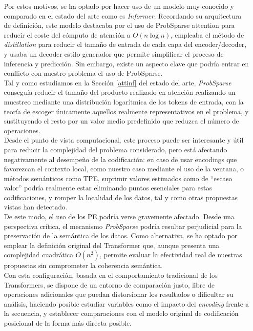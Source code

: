Por estos motivos, se ha optado por hacer uso de un modelo muy conocido y comparado en el estado del arte como es \textit{Informer}. Recordando su arquitectura de definición, este modelo destacaba por el uso de ProbSparse attention para reducir el coste del cómputo de atención a $O(n \log{n})$, empleaba el método de \textit{distillation} para reducir el tamaño de entrada de cada capa del encoder/decoder, y usaba un decoder estilo generador que permite simplificar el proceso de inferencia y predicción. Sin embargo, existe un aspecto clave que podría entrar en conflicto con nuestro problema el uso de ProbSparse.\\

Tal y como estudiamos en la Sección \ref{attinf} del estado del arte, \textit{ProbSparse} conseguía reducir el tamaño del producto realizado en atención realizando un muestreo mediante una distribución logarítmica de los tokens de entrada, con la teoría de escoger únicamente aquellos realmente representativos en el problema, y sustituyendo el resto por un valor medio predefinido que reduzca el número de operaciones.\\
	
Desde el punto de vista computacional, este proceso puede ser interesante y útil para reducir la complejidad del problema considerado, pero está afectando negativamente al desempeño de la codificación: en caso de usar encodings que favorezcan el contexto local, como nuestro caso mediante el uso de la ventana, o métodos semánticos como TPE, suprimir valores estimados como de ``escaso valor'' podría realmente estar eliminando puntos esenciales para estas codificaciones, y romper la localidad de los datos, tal y como otras propuestas vistas han detectado.\\

De este modo, el uso de los PE podría verse gravemente afectado. Desde una perspectiva crítica, el mecanismo \textit{ProbSparse} podría resultar perjudicial para la preservación de la semántica de los datos. Como alternativa, se ha optado por emplear la definición original del Transformer que, aunque presenta una complejidad cuadrática $O(n^2)$, permite evaluar la efectividad real de nuestras propuestas sin comprometer la coherencia semántica.\\

Con esta configuración, basada en el comportamiento tradicional de los Transformers, se dispone de un entorno de comparación justo, libre de operaciones adicionales que puedan distorsionar los resultados o dificultar su análisis, haciendo posible estudiar variables como el impacto del \textit{encoding} frente a la secuencia, y establecer comparaciones con el modelo original de codificación posicional de la forma más directa posible.

